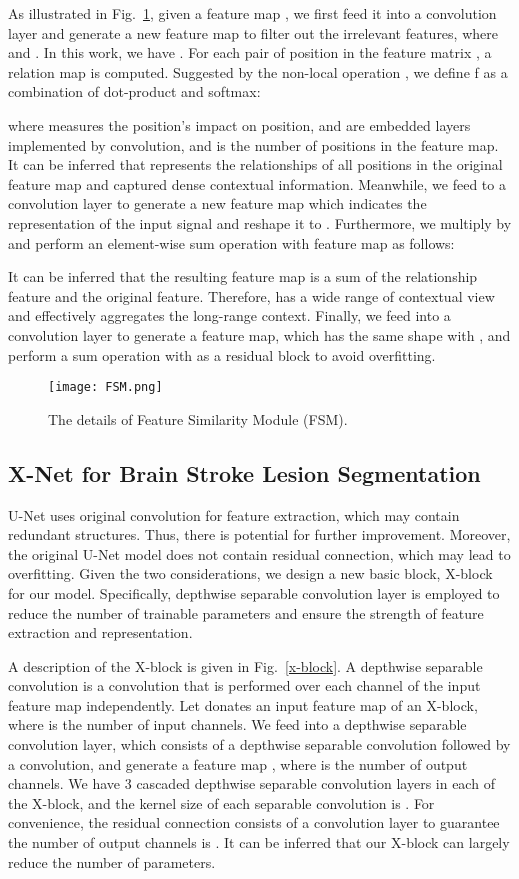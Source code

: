\documentclass[runningheads]{llncs}
\begin{document}
As illustrated in Fig.~\ref{FSM}, given a feature map , we first feed it into a convolution layer and generate a new feature map  to filter out the irrelevant features, where  and . In this work, we have . For each pair of position  in the feature matrix , a relation map  is computed. Suggested by the non-local operation \cite{[15],[19]}, we define f as a combination of dot-product and softmax:

where  measures the  position’s impact on  position,  and  are embedded layers implemented by  convolution, and  is the number of positions in the feature map. It can be inferred that  represents the relationships of all positions in the original feature map and captured dense contextual information. Meanwhile, we feed  to a  convolution layer to generate a new feature map  which indicates the representation of the input signal and reshape it to . Furthermore, we multiply  by  and perform an element-wise sum operation with feature map  as follows:


It can be inferred that the resulting feature map  is a sum of the relationship feature and the original feature. Therefore,  has a wide range of contextual view and effectively aggregates the long-range context. Finally, we feed  into a convolution layer to generate a feature map, which has the same shape with , and perform a sum operation with  as a residual block to avoid overfitting. 

\begin{figure}
	\texttt{[image: FSM.png]}
	\caption{The details of Feature Similarity Module (FSM).} \label{FSM}
\end{figure}

\subsection{X-Net for Brain Stroke Lesion Segmentation}
U-Net \cite{[5]} uses original convolution for feature extraction, which may contain redundant structures. Thus, there is potential for further improvement. Moreover, the original U-Net model does not contain residual connection, which may lead to overfitting. Given the two considerations, we design a new basic block, X-block for our model. Specifically, depthwise separable convolution layer is employed to reduce the number of trainable parameters and ensure the strength of feature extraction and representation.

A description of the X-block is given in Fig.~\ref{x-block}. A depthwise separable convolution is a convolution that is performed over each channel of the input feature map independently. Let  donates an input feature map of an X-block, where  is the number of input channels. We feed  into a depthwise separable convolution layer, which consists of a depthwise separable convolution followed by a  convolution, and generate a feature map , where  is the number of output channels. We have 3 cascaded depthwise separable convolution layers in each of the X-block, and the kernel size of each separable convolution is . For convenience, the residual connection consists of a  convolution layer to guarantee the number of output channels is . It can be inferred that our X-block can largely reduce the number of parameters.
\end{document}
